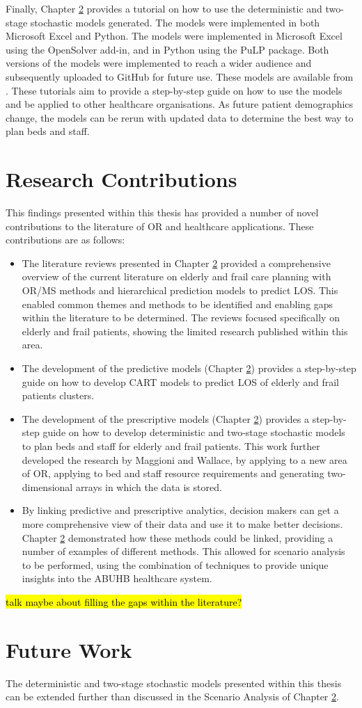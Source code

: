 \documentclass[../thesis.tex]{subfiles}
\begin{document}
Finally, Chapter \ref{} provides a tutorial on how to use the deterministic and two-stage stochastic models generated. The models were implemented in both Microsoft Excel and Python. The models were implemented in Microsoft Excel using the OpenSolver add-in, and in Python using the PuLP package. Both versions of the models were implemented to reach a wider audience and subsequently uploaded to GitHub for future use. These models are available from \cite{}. These tutorials aim to provide a step-by-step guide on how to use the models and be applied to other healthcare organisations. As future patient demographics change, the models can be rerun with updated data to determine the best way to plan beds and staff.

\section{Research Contributions}
This findings presented within this thesis has provided a number of novel contributions to the literature of OR and healthcare applications. These contributions are as follows:
\begin{itemize}
    \item The literature reviews presented in Chapter \ref{} provided a comprehensive overview of the current literature on elderly and frail care planning with OR/MS methods and hierarchical prediction models to predict LOS. This enabled common themes and methods to be identified and enabling gaps within the literature to be determined. The reviews focused specifically on elderly and frail patients, showing the limited research published within this area.
    \item The development of the predictive models (Chapter \ref{}) provides a step-by-step guide on how to develop CART models to predict LOS of elderly and frail patients clusters. 
    \item The development of the prescriptive models (Chapter \ref{}) provides a step-by-step guide on how to develop deterministic and two-stage stochastic models to plan beds and staff for elderly and frail patients. This work further developed the research by Maggioni and Wallace, by applying to a new area of OR, applying to bed and staff resource requirements and generating two-dimensional arrays in which the data is stored.
    \item By linking predictive and prescriptive analytics, decision makers can get a more comprehensive view of their data and use it to make better decisions. Chapter \ref{} demonstrated how these methods could be linked, providing a number of examples of different methods. This allowed for scenario analysis to be performed, using the combination of techniques to provide unique insights into the ABUHB healthcare system.
\end{itemize}
\hl{talk maybe about filling the gaps within the literature?}

\section{Future Work}
The deterministic and two-stage stochastic models presented within this thesis can be extended further than discussed in the Scenario Analysis of Chapter \ref{}.
\end{document}
